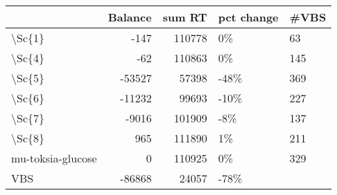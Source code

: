 \begin{tabular}{lrrll}
\toprule
{} &  Balance &  sum RT & pct change & \#VBS \\
\midrule
\textbackslash Sc\{1\}            &     -147 &  110778 &         0\% &   63 \\
\textbackslash Sc\{4\}            &      -62 &  110863 &         0\% &  145 \\
\textbackslash Sc\{5\}            &   -53527 &   57398 &       -48\% &  369 \\
\textbackslash Sc\{6\}            &   -11232 &   99693 &       -10\% &  227 \\
\textbackslash Sc\{7\}            &    -9016 &  101909 &        -8\% &  137 \\
\textbackslash Sc\{8\}            &      965 &  111890 &         1\% &  211 \\
mu-toksia-glucose &        0 &  110925 &         0\% &  329 \\
VBS               &   -86868 &   24057 &       -78\% &      \\
\bottomrule
\end{tabular}
